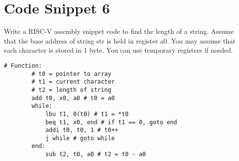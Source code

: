 \documentclass[12pt]{article}
\begin{document}
    \newpage
    \section{Code Snippet 6}
    \begin{flushleft}
        Write a RISC-V assembly snippet code to find the length of a string. Assume
        that the base address of string str is held in register a0. You may assume that each
        character is stored in 1 byte. You can use temporary registers if needed.
    \end{flushleft}
    \begin{lstlisting}[language=RISCV]
        # Function:
        # t0 = pointer to array
        # t1 = current character
        # t2 = length of string
        add t0, x0, a0 # t0 = a0
        while: 
            lbu t1, 0(t0) # t1 = *t0
            beq t1, x0, end # if t1 == 0, goto end
            addi t0, t0, 1 # t0++
            j while # goto while
        end: 
            sub t2, t0, a0 # t2 = t0 - a0
    \end{lstlisting}
\end{document}
